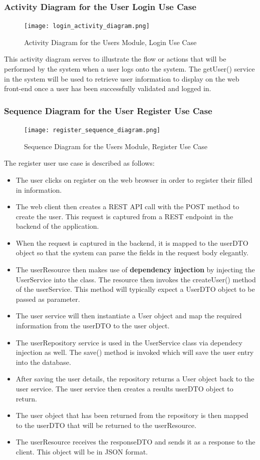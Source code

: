 \documentclass[runningheads,a4paper]{article}
\begin{document}
\subsubsection {Activity Diagram for the User Login Use Case}
 	\begin{figure}[H]
   	\centering
   	\texttt{[image: login\_activity\_diagram.png]}
   	\caption{Activity Diagram for the Users Module, Login Use Case}
	\end{figure}
	
	This activity diagram serves to illustrate the flow or actions that will be performed by the system when a user logs onto the system. The getUser() service in the system will be used to retrieve user information to display on the web front-end once a user has been successfully validated and logged in. 
\subsubsection {Sequence Diagram for the User Register Use Case}
 	\begin{figure}[H]
   	\centering
   	\texttt{[image: register\_sequence\_diagram.png]}
   	\caption{Sequence Diagram for the Users Module, Register Use Case}
	\end{figure}
	
	The register user use case is described as follows: 
	\begin{itemize}
		\item The user clicks on register on the web browser in order to register their filled in information. 
		\item The web client then creates a REST API call with the POST method to create the user. This request is captured from a REST endpoint in the backend of the application.
		\item When the request is captured in the backend, it is mapped to the userDTO object so that the system can parse the fields in the request body elegantly. 
		\item The userResource then makes use of \textbf{dependency injection} by injecting the UserService into the class. The resource then invokes the createUser() method of the userService. This method will typically expect a UserDTO object to be passed as parameter.
		\item The user service will then instantiate a User object and map the required information from the userDTO to the user object. 
		\item The userRepository service is used in the UserService class via dependecy injection as well. The save() method is invoked which will save the user entry into the database. 
		\item After saving the user details, the repository returns a User object back to the user service. The user service then creates a results userDTO object to return. 
		\item The user object that has been returned from the repository is then mapped to the userDTO that will be returned to the userResource. 
		\item The userResource receives the responseDTO and sends it as a response to the client. This object will be in JSON format. 
	\end{itemize}
\end{document}
